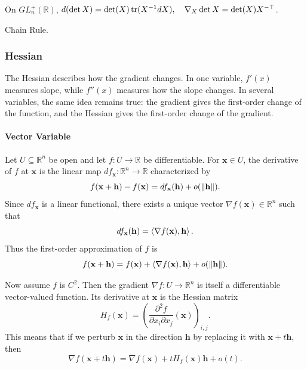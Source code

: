\begin{corollary}[Determinant]
On $GL_n^+(\mathbb{R})$,
$d(\det X)=\det(X)\operatorname{tr}(X^{-1}dX),\quad\nabla_X\det X=\det(X)X^{-\top}$.
\end{corollary}

\begin{pfbox}
    Chain Rule.
\end{pfbox}

\subsubsection*{Hessian}

The Hessian describes how the gradient changes. In one variable, $f'(x)$
measures slope, while $f''(x)$ measures how the slope changes. In several
variables, the same idea remains true: the gradient gives the first-order
change of the function, and the Hessian gives the first-order change of the
gradient.

\paragraph*{Vector Variable}

Let $U\subseteq\mathbb{R}^n$ be open and let $f:U\to\mathbb{R}$ be
differentiable. For $\mathbf{x}\in U$, the derivative of $f$ at $\mathbf{x}$ is
the linear map $df_{\mathbf{x}}:\mathbb{R}^n\to\mathbb{R}$ characterized by
\[
    f(\mathbf{x}+\mathbf{h})-f(\mathbf{x})
    =
    df_{\mathbf{x}}(\mathbf{h})
    +
    o(\left\lVert \mathbf{h} \right\rVert).
\]
Since $df_{\mathbf{x}}$ is a linear functional, there exists a unique vector
$\nabla f(\mathbf{x})\in\mathbb{R}^n$ such that
\[
    df_{\mathbf{x}}(\mathbf{h})
    =
    \left\langle \nabla f(\mathbf{x}), \mathbf{h} \right\rangle.
\]
Thus the first-order approximation of $f$ is
\[
    f(\mathbf{x}+\mathbf{h})
    =
    f(\mathbf{x})
    +
    \left\langle \nabla f(\mathbf{x}), \mathbf{h} \right\rangle
    +
    o(\left\lVert \mathbf{h} \right\rVert).
\]



Now assume $f$ is $C^2$. Then the gradient $\nabla f:U\to\mathbb{R}^n$ is itself
a differentiable vector-valued function. Its derivative at $\mathbf{x}$ is the
Hessian matrix
\[
    H_f(\mathbf{x})
    =
    \left(
        \frac{\partial^2 f}{\partial x_i\partial x_j}(\mathbf{x})
    \right)_{i,j}.
\]
This means that if we perturb $\mathbf{x}$ in the direction $\mathbf{h}$ by
replacing it with $\mathbf{x}+t\mathbf{h}$, then
\[
    \nabla f(\mathbf{x}+t\mathbf{h})
    =
    \nabla f(\mathbf{x})
    +
    tH_f(\mathbf{x})\mathbf{h}
    +
    o(t).
\]

